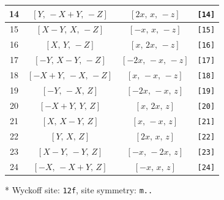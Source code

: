 \documentclass[fleqn,8pt]{jsarticle}
\begin{document}
\begin{longtable}{cccc}
14 & $\left[ Y,\, - X + Y,\, - Z \right]$ & $\left[ 2 x,\, x,\, - z \right]$ & {\tt [14]} \\ \hline
15 & $\left[ X - Y,\, X,\, - Z \right]$ & $\left[ - x,\, x,\, - z \right]$ & {\tt [15]} \\ \hline
16 & $\left[ X,\, Y,\, - Z \right]$ & $\left[ x,\, 2 x,\, - z \right]$ & {\tt [16]} \\ \hline
17 & $\left[ - Y,\, X - Y,\, - Z \right]$ & $\left[ - 2 x,\, - x,\, - z \right]$ & {\tt [17]} \\ \hline
18 & $\left[ - X + Y,\, - X,\, - Z \right]$ & $\left[ x,\, - x,\, - z \right]$ & {\tt [18]} \\ \hline
19 & $\left[ - Y,\, - X,\, Z \right]$ & $\left[ - 2 x,\, - x,\, z \right]$ & {\tt [19]} \\ \hline
20 & $\left[ - X + Y,\, Y,\, Z \right]$ & $\left[ x,\, 2 x,\, z \right]$ & {\tt [20]} \\ \hline
21 & $\left[ X,\, X - Y,\, Z \right]$ & $\left[ x,\, - x,\, z \right]$ & {\tt [21]} \\ \hline
22 & $\left[ Y,\, X,\, Z \right]$ & $\left[ 2 x,\, x,\, z \right]$ & {\tt [22]} \\ \hline
23 & $\left[ X - Y,\, - Y,\, Z \right]$ & $\left[ - x,\, - 2 x,\, z \right]$ & {\tt [23]} \\ \hline
24 & $\left[ - X,\, - X + Y,\, Z \right]$ & $\left[ - x,\, x,\, z \right]$ & {\tt [24]} \\
\end{longtable}
* Wyckoff site: {\tt 12f}, site symmetry: {\tt m..}
\renewcommand{\arraystretch}{1.2}
\end{document}
